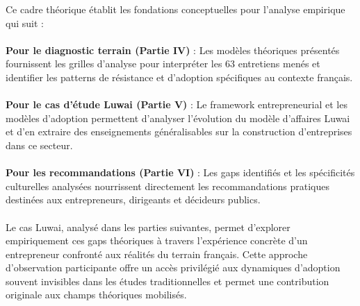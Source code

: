Ce cadre théorique établit les fondations conceptuelles pour l'analyse empirique qui suit :
\\\\
\textbf{Pour le diagnostic terrain (Partie IV)} : Les modèles théoriques présentés fournissent les grilles d'analyse pour interpréter les 63 entretiens menés et identifier les patterns de résistance et d'adoption spécifiques au contexte français.
\\\\
\textbf{Pour le cas d'étude Luwai (Partie V)} : Le framework entrepreneurial et les modèles d'adoption permettent d'analyser l'évolution du modèle d'affaires Luwai et d'en extraire des enseignements généralisables sur la construction d'entreprises dans ce secteur.
\\\\
\textbf{Pour les recommandations (Partie VI)} : Les gaps identifiés et les spécificités culturelles analysées nourrissent directement les recommandations pratiques destinées aux entrepreneurs, dirigeants et décideurs publics.
\\\\
Le cas Luwai, analysé dans les parties suivantes, permet d'explorer empiriquement ces gaps théoriques à travers l'expérience concrète d'un entrepreneur confronté aux réalités du terrain français. Cette approche d'observation participante offre un accès privilégié aux dynamiques d'adoption souvent invisibles dans les études traditionnelles et permet une contribution originale aux champs théoriques mobilisés.
